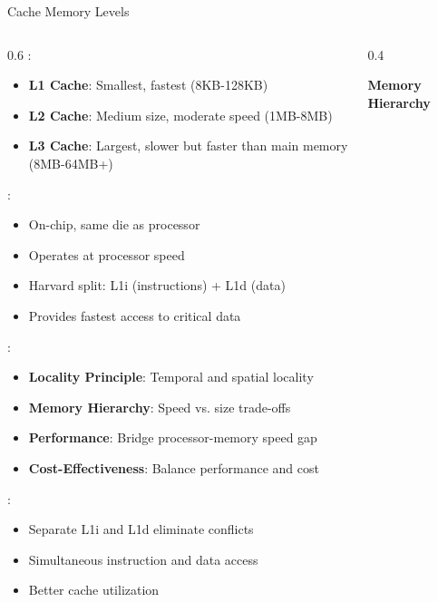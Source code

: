 \begin{frame}{Cache Memory Levels}
\begin{columns}
\begin{column}{0.6\textwidth}
:
\begin{itemize}
\item \textbf{L1 Cache}: Smallest, fastest (8KB-128KB)
\item \textbf{L2 Cache}: Medium size, moderate speed (1MB-8MB)
\item \textbf{L3 Cache}: Largest, slower but faster than main memory (8MB-64MB+)
\end{itemize}

\vspace{0.3cm}
:
\begin{itemize}
\item On-chip, same die as processor
\item Operates at processor speed
\item Harvard split: L1i (instructions) + L1d (data)
\item Provides fastest access to critical data
\end{itemize}

\vspace{0.3cm}
:
\begin{itemize}
\item \textbf{Locality Principle}: Temporal and spatial locality
\item \textbf{Memory Hierarchy}: Speed vs. size trade-offs
\item \textbf{Performance}: Bridge processor-memory speed gap
\item \textbf{Cost-Effectiveness}: Balance performance and cost
\end{itemize}

\vspace{0.3cm}
:
\begin{itemize}
\item Separate L1i and L1d eliminate conflicts
\item Simultaneous instruction and data access
\item Better cache utilization
\end{itemize}
\end{column}
\begin{column}{0.4\textwidth}
\begin{center}
\textbf{Memory Hierarchy}
\vspace{0.3cm}


\end{center}
\end{column}
\end{columns}
\end{frame}
